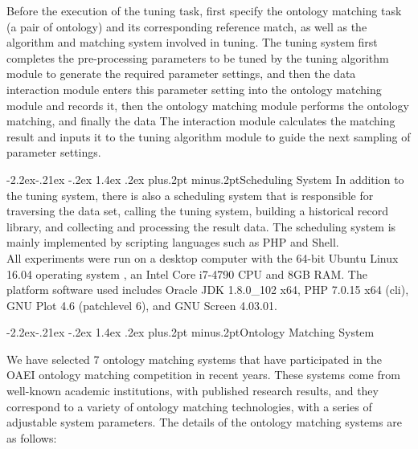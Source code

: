 \documentclass[twoside]{article}
\makeatletter
\def\subsubsection{\@startsection{subsubsection}{3}{\z@}%
 {-2.2ex\@plus -.21ex \@minus -.2ex}%
 {1.4ex \@plus.2ex}
{\normalfont\normalsize\protect\baselineskip=12pt plus.2pt minus.2pt\sl}}
\makeatother
\begin{document}
Before the execution of the tuning task, first specify the ontology matching task (a pair of ontology) and its corresponding reference match, as well as the algorithm and matching system involved in tuning.
The tuning system first completes the pre-processing parameters to be tuned by the tuning algorithm module to generate the required parameter settings, and then the data interaction module enters this parameter setting into the ontology matching module and records it, then the ontology matching module performs the ontology matching, and finally the data The interaction module calculates the matching result and inputs it to the tuning algorithm module to guide the next sampling of parameter settings.

\subsubsection{Scheduling System}
In addition to the tuning system, there is also a scheduling system that is responsible for traversing the data set, calling the tuning system, building a historical record library, and collecting and processing the result data. The scheduling system is mainly implemented by scripting languages such as PHP and Shell. \\

All experiments were run on a desktop computer with the 64-bit Ubuntu Linux 16.04 operating system , an Intel Core i7-4790 CPU and 8GB RAM.
The platform software used includes Oracle JDK 1.8.0\_102 x64, PHP 7.0.15 x64 (cli), GNU Plot 4.6 (patchlevel 6), and GNU Screen 4.03.01.


\subsubsection{Ontology Matching System}

We have selected 7 ontology matching systems that have participated in the OAEI ontology matching competition in recent years.
These systems come from well-known academic institutions, with published research results, and they correspond to a variety of ontology matching technologies, with a series of adjustable system parameters.
The details of the ontology matching systems are as follows:
\end{document}
